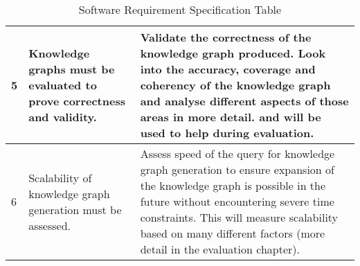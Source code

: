\begin{longtable}{|p{2.25cm}|p{5.5cm}|p{5.5cm}|}
5&
Knowledge graphs must be evaluated to prove correctness and validity. &
Validate the correctness of the knowledge graph produced. Look into the accuracy, coverage and coherency of the knowledge graph and analyse different aspects of those areas in more detail. \cite{knowledgegraphevaulationbook} and \cite{evaluationpaper} will be used to help during evaluation. \\ 
\hline

6&
Scalability of knowledge graph generation must be assessed. &
Assess speed of the query for knowledge graph generation to ensure expansion of the knowledge graph is possible in the future without encountering severe time constraints. This will measure scalability based on many different factors (more detail in the evaluation chapter). 
\hline
\caption{Software Requirement Specification Table}
\end{longtable}

